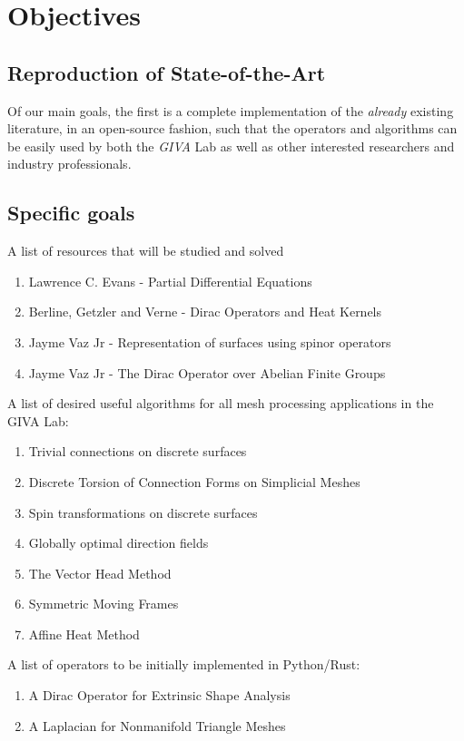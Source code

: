 \chapter{Objectives}

\section{Reproduction of State-of-the-Art}

Of our main goals, the first is a complete implementation of the
\textit{already} existing literature, in an open-source fashion, such
that the operators and algorithms can be easily used by both the \textit{GIVA} Lab
as well as other interested researchers and industry professionals.

\spa



\section{Specific goals}

A list of resources that will be studied and solved

\begin{enumerate}
    \item Lawrence C. Evans - Partial Differential Equations \cite{evans_pde_2010}
    \item Berline, Getzler and Verne - Dirac Operators and Heat Kernels \cite{berline_heat_2004}
    \item Jayme Vaz Jr - Representation of surfaces using spinor operators \cite{vaz2019representation_spinor}
    \item Jayme Vaz Jr - The Dirac Operator over Abelian Finite Groups \cite{vaz1997dirac}
\end{enumerate}

A list of desired useful algorithms for all mesh processing applications
in the GIVA Lab:

\begin{enumerate}
    \item Trivial connections on discrete surfaces \cite{Crane:2010:TCD}
    \item Discrete Torsion of Connection Forms on Simplicial Meshes \cite{discrete_torsion}
    \item Spin transformations on discrete surfaces \cite{Crane:2011:STD}
    \item Globally optimal direction fields \cite{Knoppel:2013:GOD}
    \item The Vector Head Method \cite{Sharp:2019:VHM}
    \item Symmetric Moving Frames \cite{Corman:2019:SMF}
    \item Affine Heat Method \cite{soliman2025affine}
\end{enumerate}

A list of operators to be initially implemented in Python/Rust:

\begin{enumerate}
    \item A Dirac Operator for Extrinsic Shape Analysis
    \item A Laplacian for Nonmanifold Triangle Meshes \cite{laplacian0}
\end{enumerate}